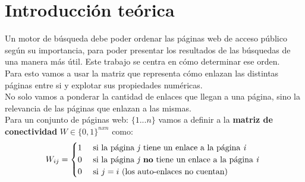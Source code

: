 \section{Introducción teórica}





Un motor de búsqueda debe poder ordenar las páginas web de acceso público según su importancia, para poder presentar los resultados de las búsquedas de una manera más útil. Este trabajo se centra en cómo determinar ese orden. \\

Para esto vamos a usar la matriz que representa cómo enlazan las distintas páginas entre si y explotar sus propiedades numéricas. \\

No solo vamos a ponderar la cantidad de enlaces que llegan a una página, sino la relevancia de las páginas que enlazan a las mismas. \\

Para un conjunto de páginas web: $\{1 ... n\}$ vamos a definir a la \textbf{matriz de conectividad} $ W \in \{0, 1\}^{nxn} $ como: \\

\[ W_{ij} =
	\begin{cases}
		1 & \text{ si la página \textit{j} tiene un enlace a la página \textit{i} } \\
		0 & \text{ si la página \textit{j} \textbf{no} tiene un enlace a la página \textit{i} } \\
		0 & \text{ si $j = i$ (los auto-enlaces no cuentan)}
	\end{cases}
\]

